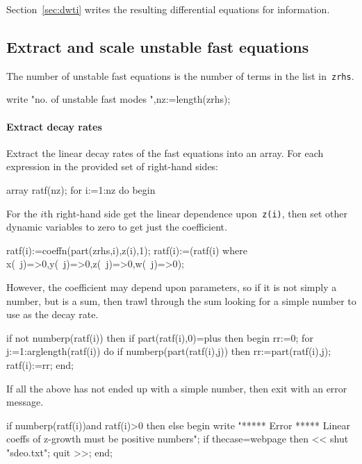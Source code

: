 \documentclass[11pt,a5paper]{article}
\begin{document}
Section~\ref{sec:dwti} writes the resulting differential equations for information.



\subsection{Extract and scale unstable fast equations}

The number of unstable fast equations is the number of terms in the list in~\verb|zrhs|.
\begin{reduce}
write "no. of unstable fast modes ",nz:=length(zrhs);
\end{reduce}

\paragraph{Extract decay rates}
Extract the linear decay rates of the fast equations into an array.
For each expression in the provided set of right-hand sides:
\begin{reduce}
array ratf(nz);
for i:=1:nz do begin
\end{reduce}

For the $i$th right-hand side get the linear dependence upon~\verb|z(i)|, then set other dynamic variables to zero to get just the coefficient.
\begin{reduce}
  ratf(i):=coeffn(part(zrhs,i),z(i),1);
  ratf(i):=(ratf(i) where {x(~j)=>0,y(~j)=>0,z(~j)=>0,w(~j)=>0});
\end{reduce}

However, the coefficient may depend upon parameters, so if it is not simply a number, but is a sum, then trawl through the sum looking for a simple number to use as the decay rate.
\begin{reduce}
  if not numberp(ratf(i)) then 
  if part(ratf(i),0)=plus then begin
    rr:=0;
    for j:=1:arglength(ratf(i)) do 
      if numberp(part(ratf(i),j)) 
      then rr:=part(ratf(i),j);
    ratf(i):=rr;
  end;
\end{reduce}

If all the above has not ended up with a simple number, then exit with an error message. 
\begin{reduce}
  if numberp(ratf(i))and ratf(i)>0 then
  else begin 
    write "***** Error *****
    Linear coeffs of z-growth must be positive numbers";
    if thecase=webpage then <<
      shut "sdeo.txt"; quit >>;
  end;
\end{reduce}
\end{document}
